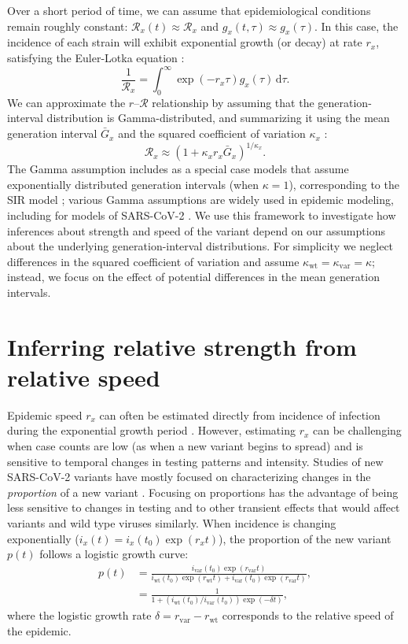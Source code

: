 \documentclass[12pt]{article}
\newcommand{\vvvar}{\mathrm{var}}
\newcommand{\wwwt}{\mathrm{wt}}
\newcommand{\rx}[1]{\ensuremath{{r}_{#1}}\xspace}
\newcommand{\rw}{\rx{\wwwt}}
\newcommand{\rv}{\rx{\vvvar}}
\newcommand{\RR}{\ensuremath{{\mathcal R}}\xspace}
\newcommand{\dd}[1]{\ensuremath{\, \mathrm{d}#1}}
\newcommand{\dtau}{\dd{\tau}}
\newcommand{\ix}[1]{\ensuremath{{i}_{#1}}\xspace}
\newcommand{\iw}{\ix{\wwwt}}
\newcommand{\iv}{\ix{\vvvar}}
\begin{document}
Over a short period of time, we can assume that epidemiological conditions remain roughly constant: $\RR_x(t) \approx \RR_x$ and $g_x(t, \tau) \approx g_x(\tau)$.
In this case, the incidence of each strain will exhibit exponential growth (or decay) at rate $r_x$, satisfying the Euler-Lotka equation \citep{wallinga2007generation}:
\begin{equation}
\frac{1}{\RR_x} = \int_0^\infty \exp(- r_x \tau) g_x(\tau) \dtau.
\end{equation}
We can approximate the $r$--$\RR$ relationship by assuming that the generation-interval distribution is Gamma-distributed, and summarizing it using the mean generation interval $\bar{G}_x$ and the squared coefficient of variation $\kappa_x$ \citep{park2019practical}:
\begin{equation}
\RR_x \approx (1 + \kappa_x r_x \bar{G}_x)^{1/\kappa_x}.
\end{equation}
The Gamma assumption includes as a special case models that assume exponentially distributed generation intervals (when $\kappa=1$), corresponding to the SIR model \citep{anderson1991infectious}; various Gamma assumptions are widely used in epidemic modeling, including for models of SARS-CoV-2 \citep{doi:10.1098/rsif.2020.0144}.
We use this framework to investigate how inferences about strength and speed of the variant depend on our assumptions about the underlying generation-interval distributions.
For simplicity we neglect differences in the squared coefficient of variation and assume $\kappa_{\mathrm{wt}} = \kappa_{\mathrm{var}} = \kappa$; instead, we focus on the effect of potential differences in the mean generation intervals.

\section{Inferring relative strength from relative speed}

Epidemic speed $r_x$ can often be estimated directly from incidence of infection during the exponential growth period \citep{mills2004transmissibility,nishiura2009transmission,ma2014estimating}.
However, estimating $r_x$ can be challenging when case counts are low (as when a new variant begins to spread) and is sensitive to temporal changes in testing patterns and intensity.
Studies of new SARS-CoV-2 variants have mostly focused on characterizing changes in the \emph{proportion} of a new variant \citep{switzerland2021variant, davies2021estimated, di2021impact, leung2021early, volz2021transmission,zhao2021}.
Focusing on proportions has the advantage of being less sensitive to changes in testing and to other transient effects that would affect variants and wild type viruses similarly.
When incidence is changing exponentially ($i_x(t) = i_x(t_0) \exp(r_x t)$), the proportion of the new variant $p(t)$ follows a logistic growth curve:
\begin{align}
p(t) &= \frac{\iv(t_0) \exp(\rv t)}{\iw(t_0) \exp(\rw t) + \iv(t_0) \exp(\rv t)},
\\ &= \frac{1}{1 + \left(\iw(t_0)/\iv(t_0)\right) \exp(-\delta t)},
\end{align}
where the logistic growth rate $\delta = \rv - \rw$ corresponds to the relative speed of the epidemic.
\end{document}
